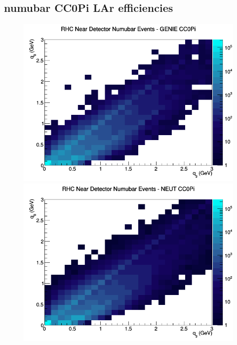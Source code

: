 \subsection{numubar CC0Pi LAr efficiencies}
\begin{figure}[h]
\includegraphics[width=\linewidth]{eff_q0_q3/LAr/CC0Pi_RHC_ND_numubar_q3_q0_GENIE.png}
\endminipage
{}
\includegraphics[width=\linewidth]{eff_q0_q3/LAr/CC0Pi_RHC_ND_numubar_q3_q0_NEUT.png}
\endminipage
{}

\end{figure}
